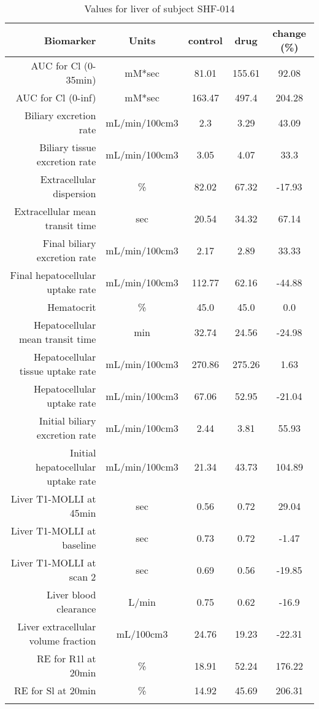 \documentclass{epflreport}%
\begin{document}
%
\clearpage%
\begin{longtable}{rcccc}%
\hline%
Biomarker&Units&control&drug&change (\%)\\%
\hline%
AUC for Cl (0{-}35min)&mM*sec&81.01&155.61&92.08\\%
AUC for Cl (0{-}inf)&mM*sec&163.47&497.4&204.28\\%
Biliary excretion rate&mL/min/100cm3&2.3&3.29&43.09\\%
Biliary tissue excretion rate&mL/min/100cm3&3.05&4.07&33.3\\%
Extracellular dispersion&\%&82.02&67.32&{-}17.93\\%
Extracellular mean transit time&sec&20.54&34.32&67.14\\%
Final biliary excretion rate&mL/min/100cm3&2.17&2.89&33.33\\%
Final hepatocellular uptake rate&mL/min/100cm3&112.77&62.16&{-}44.88\\%
Hematocrit&\%&45.0&45.0&0.0\\%
Hepatocellular mean transit time&min&32.74&24.56&{-}24.98\\%
Hepatocellular tissue uptake rate&mL/min/100cm3&270.86&275.26&1.63\\%
Hepatocellular uptake rate&mL/min/100cm3&67.06&52.95&{-}21.04\\%
Initial biliary excretion rate&mL/min/100cm3&2.44&3.81&55.93\\%
Initial hepatocellular uptake rate&mL/min/100cm3&21.34&43.73&104.89\\%
Liver T1{-}MOLLI at 45min&sec&0.56&0.72&29.04\\%
Liver T1{-}MOLLI at baseline&sec&0.73&0.72&{-}1.47\\%
Liver T1{-}MOLLI at scan 2&sec&0.69&0.56&{-}19.85\\%
Liver blood clearance&L/min&0.75&0.62&{-}16.9\\%
Liver extracellular volume fraction&mL/100cm3&24.76&19.23&{-}22.31\\%
RE for R1l at 20min&\%&18.91&52.24&176.22\\%
RE for Sl at 20min&\%&14.92&45.69&206.31\\%
\hline%
\caption{Values for liver of subject SHF-014} \\%
\end{longtable}%
\end{document}
